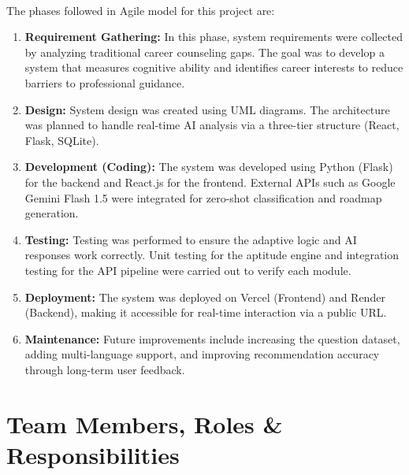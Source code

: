 \paragraph{}
The phases followed in Agile model for this project are:
\vspace{-10pt}
\begin{enumerate}
\setlength{\itemsep}{2pt}
\setlength{\topsep}{2pt}
\setlength{\parskip}{0pt}
\setlength{\parindent}{0pt}
\item \textbf{Requirement Gathering:} 
In this phase, system requirements were collected by analyzing traditional career counseling gaps. The goal was to develop a system that measures cognitive ability and identifies career interests to reduce barriers to professional guidance.

\item \textbf{Design:}
System design was created using UML diagrams. The architecture was planned to handle real-time AI analysis via a three-tier structure (React, Flask, SQLite).

\item \textbf{Development (Coding):}
The system was developed using Python (Flask) for the backend and React.js for the frontend. External APIs such as Google Gemini Flash 1.5 were integrated for zero-shot classification and roadmap generation.

\item \textbf{Testing:}
Testing was performed to ensure the adaptive logic and AI responses work correctly. Unit testing for the aptitude engine and integration testing for the API pipeline were carried out to verify each module.

\item \textbf{Deployment:}
The system was deployed on Vercel (Frontend) and Render (Backend), making it accessible for real-time interaction via a public URL.

\item \textbf{Maintenance:}
Future improvements include increasing the question dataset, adding multi-language support, and improving recommendation accuracy through long-term user feedback.

\end{enumerate}
\section{Team Members, Roles \& Responsibilities}

